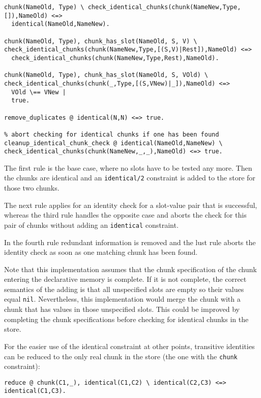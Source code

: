 \begin{lstlisting}
chunk(NameOld, Type) \ check_identical_chunks(chunk(NameNew,Type,[]),NameOld) <=> 
  identical(NameOld,NameNew).
  
chunk(NameOld, Type), chunk_has_slot(NameOld, S, V) \ check_identical_chunks(chunk(NameNew,Type,[(S,V)|Rest]),NameOld) <=> 
  check_identical_chunks(chunk(NameNew,Type,Rest),NameOld).
  
chunk(NameOld, Type), chunk_has_slot(NameOld, S, VOld) \ check_identical_chunks(chunk(_,Type,[(S,VNew)|_]),NameOld) <=> 
  VOld \== VNew |
  true.
    
remove_duplicates @ identical(N,N) <=> true.

% abort checking for identical chunks if one has been found
cleanup_identical_chunk_check @ identical(NameOld,NameNew) \ check_identical_chunks(chunk(NameNew,_,_),NameOld) <=> true.
\end{lstlisting}

The first rule is the base case, where no slots have to be tested any more. Then the chunks are identical and an \verb|identical/2| constraint is added to the store for those two chunks.

The next rule applies for an identity check for a slot-value pair that is successful, whereas the third rule handles the opposite case and aborts the check for this pair of chunks without adding an \verb|identical| constraint.

In the fourth rule redundant information is removed and the lust rule aborts the identity check as soon as one matching chunk has been found.

Note that this implementation assumes that the chunk specification of the chunk entering the declarative memory is complete. If it is not complete, the correct semantics of the adding is that all unspecified slots are empty so their values equal \verb|nil|. Nevertheless, this implementation would merge the chunk with a chunk that has values in those unspecified slots. This could be improved by completing the chunk specifications before checking for identical chunks in the store.

For the easier use of the identical constraint at other points, transitive identities can be reduced to the only real chunk in the store (the one with the \verb|chunk| constraint):

\begin{lstlisting}
reduce @ chunk(C1,_), identical(C1,C2) \ identical(C2,C3) <=> identical(C1,C3).
\end{lstlisting}

